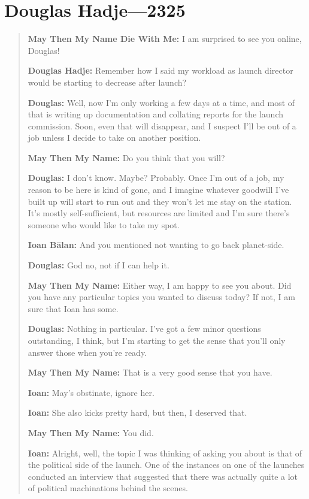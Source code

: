 \hypertarget{douglas-hadje-2325}{%
\chapter{Douglas Hadje---2325}\label{douglas-hadje-2325}}

\begin{quote}
\textbf{May Then My Name Die With Me:} I am surprised to see you online, Douglas!

\textbf{Douglas Hadje:} Remember how I said my workload as launch director would be starting to decrease after launch?

\textbf{Douglas:} Well, now I'm only working a few days at a time, and most of that is writing up documentation and collating reports for the launch commission. Soon, even that will disappear, and I suspect I'll be out of a job unless I decide to take on another position.

\textbf{May Then My Name:} Do you think that you will?

\textbf{Douglas:} I don't know. Maybe? Probably. Once I'm out of a job, my reason to be here is kind of gone, and I imagine whatever goodwill I've built up will start to run out and they won't let me stay on the station. It's mostly self-sufficient, but resources are limited and I'm sure there's someone who would like to take my spot.

\textbf{Ioan Bălan:} And you mentioned not wanting to go back planet-side.

\textbf{Douglas:} God no, not if I can help it.

\textbf{May Then My Name:} Either way, I am happy to see you about. Did you have any particular topics you wanted to discuss today? If not, I am sure that Ioan has some.

\textbf{Douglas:} Nothing in particular. I've got a few minor questions outstanding, I think, but I'm starting to get the sense that you'll only answer those when you're ready.

\textbf{May Then My Name:} That is a very good sense that you have.

\textbf{Ioan:} May's obstinate, ignore her.

\textbf{Ioan:} She also kicks pretty hard, but then, I deserved that.

\textbf{May Then My Name:} You did.

\textbf{Ioan:} Alright, well, the topic I was thinking of asking you about is that of the political side of the launch. One of the instances on one of the launches conducted an interview that suggested that there was actually quite a lot of political machinations behind the scenes.


\end{quote}
